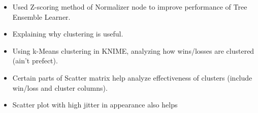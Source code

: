 
\begin{itemize}
  \item Used Z-scoring method of Normalizer node to improve performance of Tree Ensemble Learner.
  \item Explaining why clustering is useful.
  \item Using k-Means clustering in KNIME, analyzing how wins/losses are clustered (ain't prefect).
  \item Certain parts of Scatter matrix help analyze effectiveness of clusters (include win/loss and cluster columns).
  \item Scatter plot with high jitter in appearance also helps
\end{itemize}
